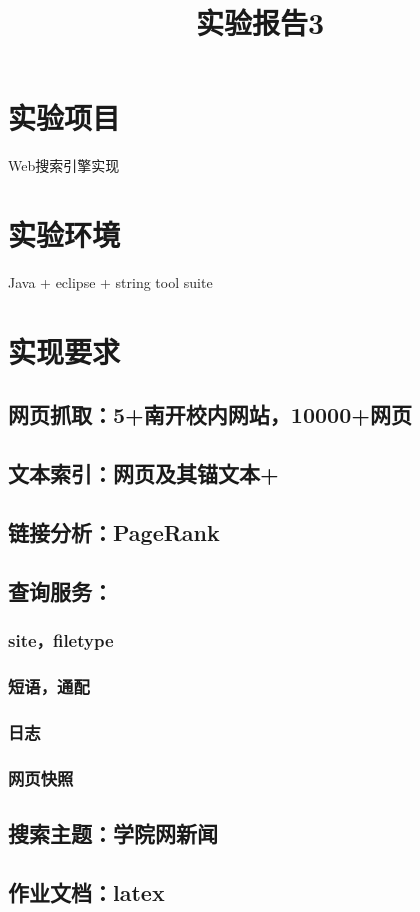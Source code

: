 ﻿\documentclass[UTF8]{ctexart}
\title{实验报告3}
\author{}
\begin{document}
\maketitle
\begin{flushleft}
\section{实验项目}
Web搜索引擎实现
\section{实验环境}
Java + eclipse + string tool suite
\section{实现要求}
\subsection{网页抓取：5+南开校内网站，10000+网页}
\subsection{文本索引：网页及其锚文本+}
\subsection{链接分析：PageRank}
\subsection{查询服务：}
\subsubsection*{site，filetype}
\subsubsection*{短语，通配}
\subsubsection*{日志}
\subsubsection*{网页快照}
\subsection{搜索主题：学院网新闻}
\subsection{作业文档：latex}

\end{flushleft}
\end{document}
